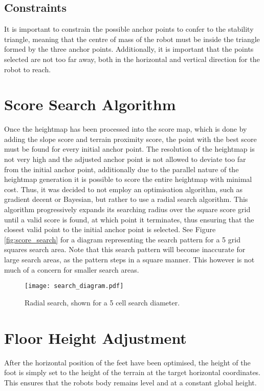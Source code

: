     \subsection{Constraints}
    It is important to constrain the possible anchor points to confer to the stability triangle,
    meaning that the centre of mass of the robot must be inside the triangle formed by the three
    anchor points. Additionally, it is important that the points selected are not too far away,
    both in the horizontal and vertical direction for the robot to reach.


\section{Score Search Algorithm} \label{sec:radial_search}
    Once the heightmap has been processed into the score map, which is done by adding the
    slope score and terrain proximity score, the point with the best score must be found for every
    initial anchor point.
    The resolution of the heightmap is not very high and the adjusted anchor point is not
    allowed to deviate too far from the initial anchor point, additionally due to the parallel nature
    of the heightmap generation it is possible to score the entire heightmap with minimal cost.
    Thus, it was decided to not employ an optimisation algorithm, such as gradient decent or
    Bayesian, but rather to use a radial search algorithm. This algorithm progressively expands
    its searching radius over the square score grid until a valid score is found, at which point it
    terminates, thus ensuring that the closest valid point to the initial anchor point is selected.
    See Figure \ref{fig:score_search} for a diagram representing the search pattern for a 5 grid squares search area.
    Note that this search pattern will become inaccurate for large search areas, as the pattern steps
    in a square manner. This however is not much of a concern for smaller search areas.

    \begin{figure}[h]
        \centering
        \texttt{[image: search\_diagram.pdf]}
        \caption{Radial search, shown for a 5 cell search diameter.}
        \label{fig:radial_search}
    \end{figure}

    \section{Floor Height Adjustment} \label{sec:height_adjust}
    After the horizontal position of the feet have been optimised, the height of the foot is simply set to the height of the
    terrain at the target horizontal coordinates. This ensures that the robots body remains level and at a constant global height.

